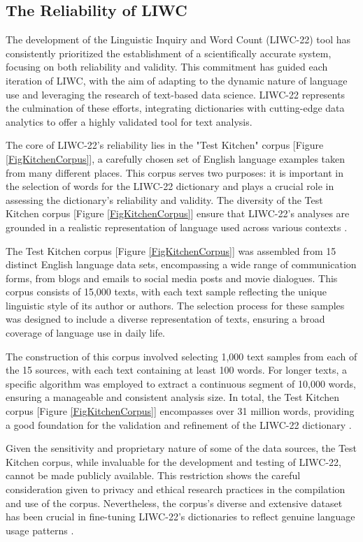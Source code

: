 \subsection{The Reliability of LIWC}

\quad The development of the Linguistic Inquiry and Word Count (LIWC-22) tool has consistently prioritized the establishment of a scientifically accurate system, focusing on both reliability and validity. This commitment has guided each iteration of LIWC, with the aim of adapting to the dynamic nature of language use and leveraging the research of text-based data science. LIWC-22 represents the culmination of these efforts, integrating dictionaries with cutting-edge data analytics to offer a highly validated tool for text analysis.

The core of LIWC-22's reliability lies in the "Test Kitchen" corpus [Figure \ref{FigKitchenCorpus}], a carefully chosen set of English language examples taken from many different places. This corpus serves two purposes: it is important in the selection of words for the LIWC-22 dictionary and plays a crucial role in assessing the dictionary's reliability and validity. The diversity of the Test Kitchen corpus [Figure \ref{FigKitchenCorpus}] ensure that LIWC-22's analyses are grounded in a realistic representation of language used across various contexts \cite{boyd2022development}.

The Test Kitchen corpus [Figure \ref{FigKitchenCorpus}] was assembled from 15 distinct English language data sets, encompassing a wide range of communication forms, from blogs and emails to social media posts and movie dialogues. This corpus consists of 15,000 texts, with each text sample reflecting the unique linguistic style of its author or authors. The selection process for these samples was designed to include a diverse representation of texts, ensuring a broad coverage of language use in daily life.

The construction of this corpus involved selecting 1,000 text samples from each of the 15 sources, with each text containing at least 100 words. For longer texts, a specific algorithm was employed to extract a continuous segment of 10,000 words, ensuring a manageable and consistent analysis size. In total, the Test Kitchen corpus [Figure \ref{FigKitchenCorpus}] encompasses over 31 million words, providing a good foundation for the validation and refinement of the LIWC-22 dictionary \cite{boyd2022development}.

Given the sensitivity and proprietary nature of some of the data sources, the Test Kitchen corpus, while invaluable for the development and testing of LIWC-22, cannot be made publicly available. This restriction shows the careful consideration given to privacy and ethical research practices in the compilation and use of the corpus. Nevertheless, the corpus's diverse and extensive dataset has been crucial in fine-tuning LIWC-22's dictionaries to reflect genuine language usage patterns .

